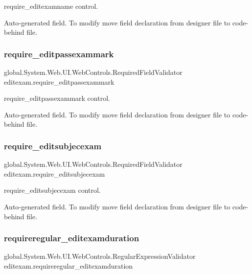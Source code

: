 require\+\_\+editexamname control. 

Auto-\/generated field. To modify move field declaration from designer file to code-\/behind file. \mbox{\label{classeditexam_ad4140580caa8ce8b75fea4ffa93b5907}} 
\subsubsection{\texorpdfstring{require\_editpassexammark}{require\_editpassexammark}}
{\footnotesize\ttfamily global.\+System.\+Web.\+U\+I.\+Web\+Controls.\+Required\+Field\+Validator editexam.\+require\+\_\+editpassexammark\hspace{0.3cm}{\ttfamily [protected]}}



require\+\_\+editpassexammark control. 

Auto-\/generated field. To modify move field declaration from designer file to code-\/behind file. \mbox{\label{classeditexam_aa30b7e69be56709493ea5b3dc76655ea}} 
\subsubsection{\texorpdfstring{require\_editsubjecexam}{require\_editsubjecexam}}
{\footnotesize\ttfamily global.\+System.\+Web.\+U\+I.\+Web\+Controls.\+Required\+Field\+Validator editexam.\+require\+\_\+editsubjecexam\hspace{0.3cm}{\ttfamily [protected]}}



require\+\_\+editsubjecexam control. 

Auto-\/generated field. To modify move field declaration from designer file to code-\/behind file. \mbox{\label{classeditexam_abb1ab1eb9831d41f61faf699e4051ef1}} 
\subsubsection{\texorpdfstring{requireregular\_editexamduration}{requireregular\_editexamduration}}
{\footnotesize\ttfamily global.\+System.\+Web.\+U\+I.\+Web\+Controls.\+Regular\+Expression\+Validator editexam.\+requireregular\+\_\+editexamduration\hspace{0.3cm}{\ttfamily [protected]}}



